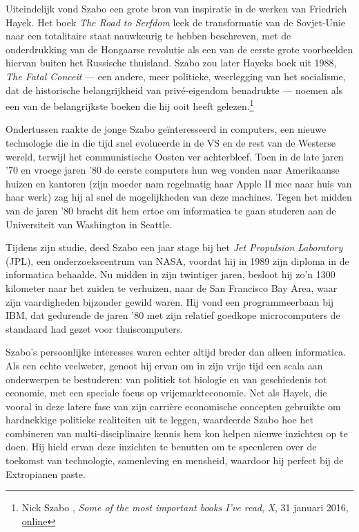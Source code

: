 \documentclass[
  a5paper,
  smalldemyvopaper,11pt,twoside,onecolumn,openright,extrafontsizes,
hidelinks]{memoir}
\begin{document}
Uiteindelijk vond Szabo een grote bron van inspiratie in de werken van
Friedrich Hayek. Het boek \emph{The Road to Serfdom} leek de
transformatie van de Sovjet-Unie naar een totalitaire staat nauwkeurig
te hebben beschreven, met de onderdrukking van de Hongaarse revolutie
als een van de eerste grote voorbeelden hiervan buiten het Russische
thuisland. Szabo zou later Hayeks boek uit 1988, \emph{The Fatal
Conceit} --- een andere, meer politieke, weerlegging van het socialisme,
dat de historische belangrijkheid van privé-eigendom benadrukte ---
noemen als een van de belangrijkste boeken die hij ooit heeft
gelezen.\footnote{Nick Szabo , \emph{Some of the most important books
  I've read}, \emph{X}, 31 januari 2016,
  \href{https://x.com/NickSzabo4/status/693682157525401601}{online}}

Ondertussen raakte de jonge Szabo geïnteresseerd in computers, een
nieuwe technologie die in die tijd snel evolueerde in de VS en de rest
van de Westerse wereld, terwijl het communistische Oosten ver
achterbleef. Toen in de late jaren '70 en vroege jaren '80 de eerste
computers hun weg vonden naar Amerikaanse huizen en kantoren (zijn
moeder nam regelmatig haar Apple II mee naar huis van haar werk) zag hij
al snel de mogelijkheden van deze machines. Tegen het midden van de
jaren '80 bracht dit hem ertoe om informatica te gaan studeren aan de
Universiteit van Washington in Seattle.

Tijdens zijn studie, deed Szabo een jaar stage bij het \emph{Jet
Propulsion Laboratory} (JPL), een onderzoekscentrum van NASA, voordat
hij in 1989 zijn diploma in de informatica behaalde. Nu midden in zijn
twintiger jaren, besloot hij zo'n 1300 kilometer naar het zuiden te
verhuizen, naar de San Francisco Bay Area, waar zijn vaardigheden
bijzonder gewild waren. Hij vond een programmeerbaan bij IBM, dat
gedurende de jaren '80 met zijn relatief goedkope microcomputers de
standaard had gezet voor thuiscomputers.

Szabo's persoonlijke interesses waren echter altijd breder dan alleen
informatica. Als een echte veelweter, genoot hij ervan om in zijn vrije
tijd een scala aan onderwerpen te bestuderen: van politiek tot biologie
en van geschiedenis tot economie, met een speciale focus op
vrijemarkteconomie. Net als Hayek, die vooral in deze latere fase van
zijn carrière economische concepten gebruikte om hardnekkige politieke
realiteiten uit te leggen, waardeerde Szabo hoe het combineren van
multi-disciplinaire kennis hem kon helpen nieuwe inzichten op te doen.
Hij hield ervan deze inzichten te benutten om te speculeren over de
toekomst van technologie, samenleving en mensheid, waardoor hij perfect
bij de Extropianen paste.
\end{document}
